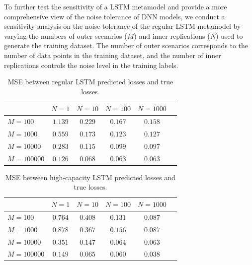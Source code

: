 To further test the sensitivity of a LSTM metamodel and provide a more comprehensive view of the noise tolerance of DNN models, we conduct a sensitivity analysis on the noise tolerance of the regular LSTM metamodel by varying the numbers of outer scenarios ($M$) and inner replications ($N$) used to generate the training dataset.
The number of outer scenarios corresponds to the number of data points in the training dataset, and the number of inner replications controls the noise level in the training labels.

\begin{table}[ht!]
    \small
    \centering
    \begin{tabular}{lccccc}
        \toprule
                            & $N=\num{1}$ & $N=\num{10}$  & $N=\num{100}$ & $N=\num{1000}$\\
        \midrule
        $M = \num{100}$      & $1.139$ & $0.229$ & $0.167$ & $0.158$ \\
        $M = \num{1000}$     & $0.559$ & $0.173$ & $0.123$ & $0.127$ \\
        $M = \num{10000}$    & $0.283$ & $0.115$ & $0.099$ & $0.097$ \\
        $M = \num{100000}$   & $0.126$ & $0.068$ & $0.063$ & $0.063$ \\
        \bottomrule
    \end{tabular}
    \caption{MSE between regular LSTM predicted losses and true losses.}
    \label{tab2:lstm_sens}
\end{table}

\begin{table}[ht!]
    \small
    \centering
    \begin{tabular}{lccccc}
        \toprule
                          & $N=\num{1}$ & $N=\num{10}$  & $N=\num{100}$ & $N=\num{1000}$\\
        \midrule
        $M = \num{100}$      & $0.764$ & $0.408$ & $0.131$ & $0.087$ \\
        $M = \num{1000}$     & $0.878$ & $0.367$ & $0.156$ & $0.087$ \\
        $M = \num{10000}$    & $0.351$ & $0.147$ & $0.064$ & $0.063$ \\
        $M = \num{100000}$   & $0.149$ & $0.065$ & $0.060$ & $0.038$ \\
        \bottomrule
    \end{tabular}
    \caption{MSE between high-capacity LSTM predicted losses and true losses.}
    \label{tab2:hicaplstm_sens}
\end{table}

